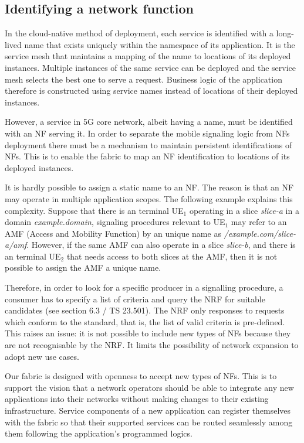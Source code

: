 \documentclass[conference]{IEEEtran}
\begin{document}
\subsection{Identifying a network function\label{sec:nf-id}}

In the cloud-native method of deployment, each service is identified with a
long-lived name that exists uniquely within the namespace of its application.
It is the service mesh that maintains a mapping of the name to locations of its
deployed instances. Multiple instances of the same service can be deployed and
the service mesh selects the best one to serve a request. Business logic of the
application therefore is constructed using service names instead of locations
of their deployed instances.

However, a service in 5G core network, albeit having a name, must be identified
with an NF serving it. In order to separate the mobile signaling logic from NFs
deployment there must be a mechanism to maintain persistent identifications of
NFs. This is to enable the fabric to map an NF identification to locations of
its deployed instances. 

It is hardly possible to assign a static name to an NF. The reason is that an
NF may operate in multiple application scopes. The following example explains
this complexity.  Suppose that there is an terminal UE$_1$ operating in a slice
\textit{slice-a} in a domain \textit{example.domain}, signaling procedures
relevant to UE$_1$ may refer to an AMF (Access and Mobility Function) by an
unique name as \textit{/example.com/slice-a/amf}.  However, if the same AMF can
also operate in a slice \textit{slice-b}, and there is an terminal UE$_2$ that
needs access to both slices at the AMF, then it is not possible to assign the
AMF a unique name.

Therefore, in order to look for a specific producer in a signalling procedure,
a consumer has to specify a list of criteria and query the NRF for suitable
candidates (see section 6.3 / TS 23.501\cite{rel16}). The NRF only responses to
requests which conform to the standard, that is, the list of valid criteria is
pre-defined. This raises an issue: it is not possible to include new types of
NFs because they are not recognisable by the NRF. It limits the possibility of
network expansion to adopt new use cases.

Our fabric is designed with openness to accept new types of NFs.  This is to
support the vision that a network operators should be able to integrate any new
applications into their networks without making changes to their existing
infrastructure. Service components of a new application can register themselves
with the fabric so that their supported services can be routed seamlessly among
them following the application's programmed logics.
\end{document}

